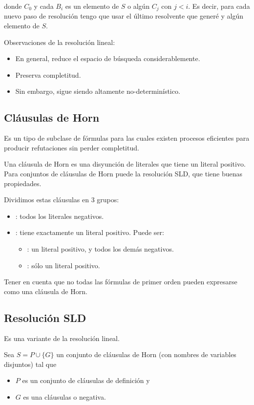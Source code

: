 donde $C_0$ y cada $B_i$ es un elemento de $S$ o algún $C_j$ con $j < i$. Es decir, para cada nuevo paso de resolución tengo que usar el último resolvente que generé y algún elemento de $S$.

Observaciones de la resolución lineal:
\begin{itemize}
  \item En general, reduce el espacio de búsqueda considerablemente.
  \item Preserva completitud.
  \item Sin embargo, sigue siendo altamente no-determinístico.
\end{itemize}

\subsection{Cláusulas de Horn}

Es un tipo de subclase de fórmulas para las cuales existen procesos eficientes para producir refutaciones sin perder completitud.

Una cláusula de Horn es una disyunción de literales que tiene  un literal positivo. Para conjuntos de cláusulas de Horn puede la resolución SLD, que tiene buenas propiedades.

Dividimos estas cláusulas en 3 grupos:
\begin{itemize}
  \item {}: todos los literales negativos.
  \item {}: tiene exactamente un literal positivo. Puede ser:
    \begin{itemize}
      \item {}: un literal positivo, y todos los demás negativos.
      \item {}: sólo un literal positivo.
    \end{itemize}
\end{itemize}

Tener en cuenta que no todas las fórmulas de primer orden pueden expresarse como una cláusula de Horn.

\subsection{Resolución SLD}

Es una variante de la resolución lineal.

Sea $S = P \cup \{G\}$ un conjunto de cláusulas de Horn (con nombres de variables disjuntos) tal que
\begin{itemize}
  \item $P$ es un conjunto de cláusulas de definición y
  \item $G$ es una cláusulas  o negativa.
\end{itemize}

